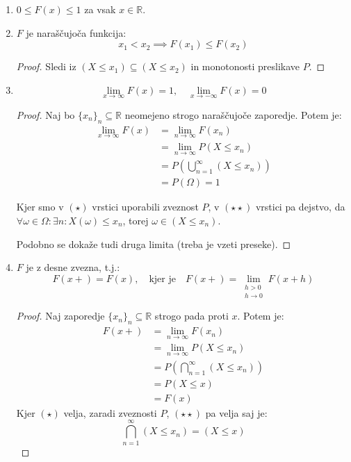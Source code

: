 \documentclass[12pt]{book}
\theoremstyle{definition}
\theoremstyle{plain}
\theoremstyle{plain}
\theoremstyle{plain}
\theoremstyle{remark}
\begin{document}
\begin{enumerate}
    \item $0 \leq F(x) \leq 1$ za vsak $x\in \mathbb{R}.$
    \item $F$ je naraščujoča funkcija: 
    $$
    x_1 < x_2 \implies F(x_1) \leq F(x_2)
    $$
    \begin{proof}
        Sledi iz $\left(X \leq x_1\right) \subseteq\left(X \leq x_2\right)$ in monotonosti preslikave $P$.
    \end{proof}
    \item 
    $$
    \lim _{x \to \infty} F(x)=1, \quad \lim _{x \to -\infty} F(x)=0
    $$
    \begin{proof}
        Naj bo $\{x_n\}_n \subseteq \mathbb{R}$ neomejeno strogo naraščujoče zaporedje. Potem je: 
        \begin{align*}
            \lim _{x \to \infty} F(x) &= \lim _{n \to \infty} F\left(x_n\right) \\
            &=\lim _{n \to \infty} P\left(X \leq x_n\right) \\
            &=P\left(\bigcup_{n=1}^{\infty}\left(X \leq x_n\right)\right) \tag{$\star$} \\
            &=P(\Omega)=1 \tag{$\star \star$}
        \end{align*}
        
        Kjer smo v $(\star)$ vrstici uporabili zveznost $P$, v $(\star \star)$ vrstici pa dejstvo, da $\forall \omega \in \Omega: \exists n: X(\omega) \leq x_n$, torej $\omega \in\left(X \leq x_n\right)$. 

        Podobno se dokaže tudi druga limita (treba je vzeti preseke).
    \end{proof}
    \item $F$ je z desne zvezna, t.j.:
    $$
    F(x+)=F(x), \quad \text{kjer je} \quad F(x+)=\lim _{\substack{h > 0 \\ h \to 0}} F(x+h)
    $$
    \begin{proof}
        Naj zaporedje $\{x_n\}_n \subseteq \mathbb{R}$ strogo pada proti $x$. Potem je:
        \begin{align*}
            F(x+)&=\lim _{n \to \infty} F\left(x_n\right) \\
            &=\lim _{n \rightarrow \infty} P\left(X \leq x_n\right) \\
            &=P\left(\bigcap_{n=1}^{\infty}\left(X \leq x_n\right)\right) \tag{$\star$} \\
            &=P(X \leq x) \tag{$\star \star$} \\
            &=F(x)
        \end{align*}
        Kjer $(\star)$ velja, zaradi zveznosti $P$, $(\star \star)$ pa velja saj je: $$\bigcap_{n=1}^{\infty}\left(X \leq x_n\right)=(X \leq x)$$


\end{proof}
\end{enumerate}
\end{document}
